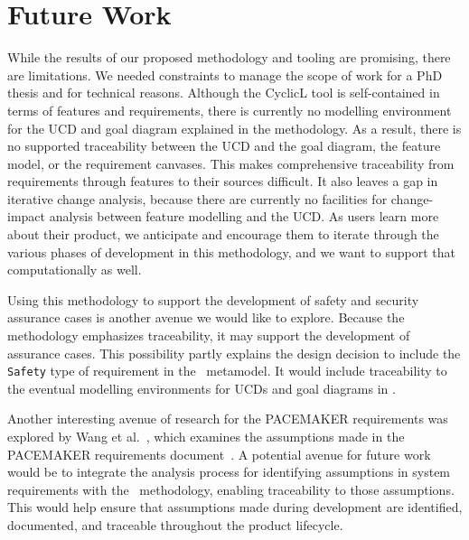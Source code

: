 \chapter{Future Work}
\label{chap:Future_Work}

While the results of our proposed methodology and tooling are promising, there are limitations. We needed constraints to manage the scope of work for a PhD thesis and for technical reasons. Although the CyclicL tool is self-contained in terms of features and requirements, there is currently no modelling environment for the \gls{UCD} and goal diagram explained in the methodology. As a result, there is no supported traceability between the \gls{UCD} and the goal diagram, the feature model, or the requirement canvases. This makes comprehensive traceability from requirements through features to their sources difficult. It also leaves a gap in iterative change analysis, because there are currently no facilities for change-impact analysis between feature modelling and the \gls{UCD}. As users learn more about their product, we anticipate and encourage them to iterate through the various phases of development in this methodology, and we want to support that computationally as well.

Using this methodology to support the development of safety and security assurance cases is another avenue we would like to explore. Because the methodology emphasizes traceability, it may support the development of assurance cases. This possibility partly explains the design decision to include the \texttt{Safety} type of requirement in the \tool\ metamodel. It would include traceability to the eventual modelling environments for \gls{UCD}s and goal diagrams in \tool.

Another interesting avenue of research for the PACEMAKER requirements was explored by Wang et al.~\cite{wang2012identification}, which examines the assumptions made in the PACEMAKER requirements document~\cite{scientific2007pacemaker}. A potential avenue for future work would be to integrate the analysis process for identifying assumptions in system requirements with the \tool\ methodology, enabling traceability to those assumptions. This would help ensure that assumptions made during development are identified, documented, and traceable throughout the product lifecycle.

